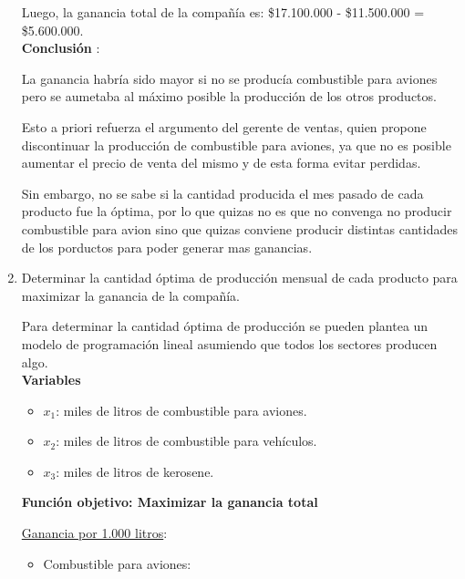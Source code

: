 \documentclass[10pt,a4paper]{article}
\begin{document}
\begin{enumerate}
    Luego, la ganancia total de la compañía es: \$17.100.000 - \$11.500.000 = \$5.600.000. \\

    \textbf{Conclusión }:

    La ganancia habría sido mayor si no se producía combustible para aviones pero se aumetaba al máximo posible 
    la producción de los otros productos. 

    Esto a priori refuerza el argumento del gerente de ventas, quien propone discontinuar la producción de combustible para aviones, 
    ya que no es posible aumentar el precio de venta del mismo y de esta forma evitar perdidas.

    Sin embargo, no se sabe si la cantidad producida el mes pasado de cada producto fue la óptima, por lo que quizas no es que no convenga no producir
    combustible para avion sino que quizas conviene producir distintas cantidades de los porductos para poder generar mas ganancias.


    \item Determinar la cantidad óptima de producción mensual de cada producto para maximizar la ganancia de la compañía.
    
    Para determinar la cantidad óptima de producción se pueden plantea un modelo de programación lineal asumiendo que todos los sectores producen algo.\\

    \textbf{Variables}

    \begin{itemize}

        \item $x_{1}$: miles de litros de combustible para aviones.
        \item $x_{2}$: miles de litros de combustible para vehículos.
        \item $x_{3}$: miles de litros de kerosene. \\

    \end{itemize}

    \textbf{Función objetivo: Maximizar la ganancia total}

    \vspace{0.5em}

    \underline{Ganancia por 1.000 litros}:

    \begin{itemize}

        \item Combustible para aviones:
        \begin{itemize}


\end{itemize}
\end{itemize}
\end{enumerate}
\end{document}
